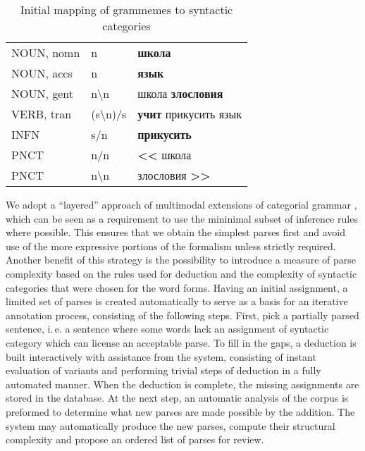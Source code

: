 \documentclass[a4paper]{article}
\theoremstyle{example-style}
\begin{document}
\begin{table}[ht]
\centering
\caption{Initial mapping of grammemes to syntactic categories}
\label{my-label}
\begin{tabular}{lll}
NOUN, nomn & n         & \textbf{школа}                              \\
NOUN, accs & n         & \textbf{язык}                               \\
NOUN, gent & n\textbackslash n      & школа \textbf{злословия}       \\
VERB, tran & (s\textbackslash n)/s & \textbf{учит} прикусить язык    \\
INFN       & s/n       & \textbf{прикусить}                          \\
PNCT       & n/n       & \textbf{\textless\textless} школа           \\
PNCT       & n\textbackslash n      & злословия \textbf{\textgreater\textgreater} 
\end{tabular}
\end{table}    
  
We adopt a ``layered'' approach of multimodal extensions of categorial grammar \parencite{morrill1994type,baldridge2003multi}, which can be seen as a requirement to use the mininimal subset of inference rules where possible. This ensures that we obtain the simplest parses first and avoid use of the more expressive portions of the formalism unless strictly required. Another benefit of this strategy is the possibility to introduce a measure of parse complexity based on the rules used for deduction and the complexity of syntactic categories that were chosen for the word forms. Having an initial assignment, a limited set of parses is created automatically to serve as a basis for an iterative annotation process, consisting of the following steps. First, pick a partially parsed sentence, i.\,e. a sentence where some words lack an assignment of syntactic category which can license an acceptable parse. To fill in the gaps, a deduction is built interactively with assistance from the system, consisting of instant evaluation of variants and performing trivial steps of deduction in a fully automated manner. When the deduction is complete, the missing assignments are stored in the database. At the next step, an automatic analysis of the corpus is preformed to determine what new parses are made possible by the addition. The system may automatically produce the new parses, compute their structural complexity and propose an ordered list of parses for review. 
\end{document}
